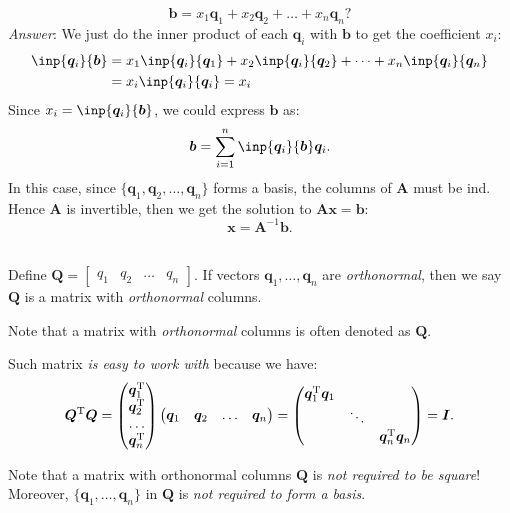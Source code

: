 \[
\bm b=x_1\bm q_1+x_2\bm q_2+\dots+x_n\bm q_n?
\]
\textit{Answer}: We just do the inner product of each $\bm q_i$ with $\bm b$ to get the coefficient $x_i$:
\[
\begin{aligned}
\inp{\bm q_i}{\bm b}&=x_1\inp{\bm q_i}{\bm q_1}+x_2\inp{\bm q_i}{\bm q_2}+\dots+x_n\inp{\bm q_i}{\bm q_n}\\
&=x_i\inp{\bm q_i}{\bm q_i}=x_i
\end{aligned}
\]
Since $x_i=\inp{\bm q_i}{\bm b}$, we could express $\bm b$ as:
\[
\bm b=\sum_{i=1}^{n}\inp{\bm q_i}{\bm b}\bm q_i.
\]
In this case, since $\{\bm q_1,\bm q_2,\dots,\bm q_n\}$ forms a basis, the columns of $\bm A$ must be ind. Hence $\bm A$ is invertible, then we get the solution to $\bm{Ax}=\bm b$:
\begin{equation}
\bm x=\bm A^{-1}\bm b.
\end{equation}
\begin{definition}\qquad\\
Define $\bm Q=\begin{bmatrix}
q_1&q_2&\dots&q_n
\end{bmatrix}$. If vectors $\bm q_1,\dots,\bm q_n$ are \emph{orthonormal}, then we say $\bm Q$ is a matrix with \emph{orthonormal} columns.
\begin{remark}
Note that a matrix with \emph{orthonormal} columns is often denoted as $\bm Q$.
\end{remark}
\end{definition}
Such matrix \emph{is easy to work with} because we have:
\begin{equation}\label{eq:easy_to_work}
\bm Q\trans\bm Q=\begin{pmatrix}
\bm q_1\trans\\\bm q_2\trans\\\dots\\\bm q_n\trans
\end{pmatrix}\begin{pmatrix}
\bm q_1&\bm q_2&\dots&\bm q_n
\end{pmatrix}=\begin{pmatrix}
\bm q_1\trans\bm q_1&&\\
&\ddots&\\
&&\bm q_n\trans\bm q_n
\end{pmatrix}=\bm I.
\end{equation}
\begin{remark}
Note that a matrix with orthonormal columns $\bm Q$ is \textit{not required to be square}! Moreover, $\{\bm q_1,\dots,\bm q_n\}$ in $\bm Q$ is \textit{not required to form a basis}.
\end{remark}
